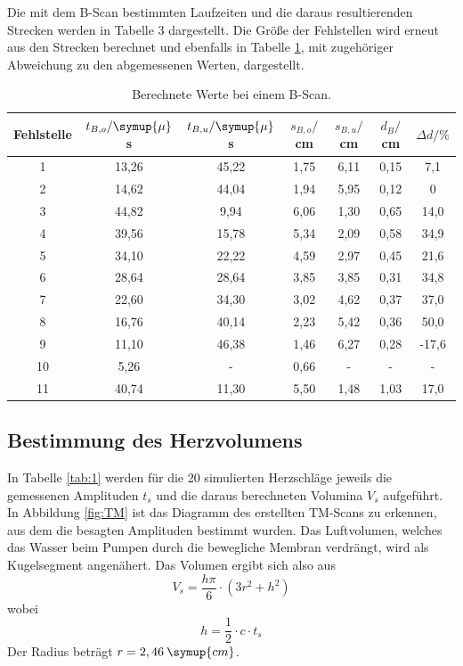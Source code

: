 Die mit dem B-Scan bestimmten Laufzeiten und die daraus resultierenden Strecken werden in Tabelle 3 dargestellt.
Die Größe der Fehlstellen wird erneut aus den Strecken berechnet und ebenfalls in Tabelle \ref{tab:2}, mit zugehöriger Abweichung
zu den abgemessenen Werten, dargestellt.

\begin{table}[H]
  \centering
  \caption{Berechnete Werte bei einem B-Scan.}
  \label{tab:2}
  \begin{tabular}{c c c c c c c}
    \toprule
  Fehlstelle & $t_{B,o}/\symup{\mu}$s & $t_{B,u}/ \symup{\mu}$s  & $s_{B,o}/$cm & $s_{B,u}/$cm & $d_B/$cm & $\Delta d/ \%$\\
    \midrule
    1  & 13,26 &  45,22 & 1,75 & 6,11  & 0,15 & 7,1      \\
    2  & 14,62 &  44,04 & 1,94 & 5,95  & 0,12 & 0  \\
    3  & 44,82 &  9,94  & 6,06 & 1,30  & 0,65 & 14,0  \\
    4  & 39,56 &  15,78 & 5,34 & 2,09  & 0,58 & 34,9  \\
    5  & 34,10 &  22,22 & 4,59 & 2,97  & 0,45 & 21,6   \\
    6  & 28,64 &  28,64 & 3,85 & 3,85  & 0,31 & 34,8   \\
    7  & 22,60 &  34,30 & 3,02 & 4,62  & 0,37 & 37,0   \\
    8  & 16,76 &  40,14 & 2,23 & 5,42  & 0,36 & 50,0    \\
    9  & 11,10 &  46,38 & 1,46 & 6,27  & 0,28 & -17,6    \\
    10 & 5,26  &  -     &  0,66 & -    & -    &  -      \\
    11 & 40,74 &  11,30 &  5,50 & 1,48 & 1,03 & 17,0   \\
    \bottomrule
  \end{tabular}
\end{table}



\subsection{Bestimmung des Herzvolumens}
In Tabelle \ref{tab:1} werden für die 20 simulierten Herzschläge jeweils die gemessenen Amplituden $t_s$ und die daraus berechneten
Volumina $V_s$ aufgeführt. In Abbildung \ref{fig:TM} ist das Diagramm des erstellten TM-Scans zu erkennen, aus dem die besagten Amplituden
bestimmt wurden. Das Luftvolumen, welches das Wasser beim Pumpen durch die bewegliche Membran verdrängt, wird als
Kugelsegment angenähert. Das Volumen ergibt sich also aus
\begin{equation*}
  V_s = \frac{h\pi}{6}\cdot(3r^2 + h^2)
\end{equation*}
wobei
\begin{equation*}
  h = \frac{1}{2}\cdot c \cdot t_s
\end{equation*}
Der Radius beträgt $r = 2,46 \: \symup{cm}$.

